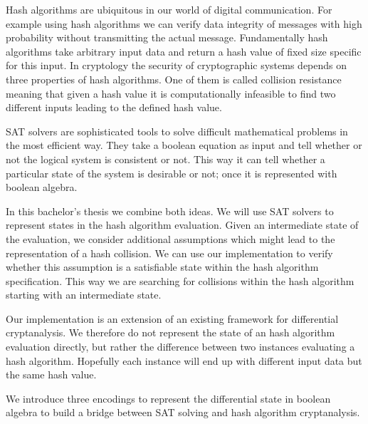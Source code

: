 Hash algorithms are ubiquitous in our world of digital communication.
For example using hash algorithms we can verify data integrity of messages
with high probability without transmitting the actual message. Fundamentally
hash algorithms take arbitrary input data and return a hash value of fixed
size specific for this input. In cryptology the security of cryptographic
systems depends on three properties of hash algorithms. One of them is called
collision resistance meaning that given a hash value it is computationally
infeasible to find two different inputs leading to the defined hash value.

SAT solvers are sophisticated tools to solve difficult mathematical problems
in the most efficient way. They take a boolean equation as input and tell
whether or not the logical system is consistent or not. This way it can tell
whether a particular state of the system is desirable or not; once it is
represented with boolean algebra.

In this bachelor's thesis we combine both ideas. We will use SAT solvers to
represent states in the hash algorithm evaluation. Given an intermediate
state of the evaluation, we consider additional assumptions which might
lead to the representation of a hash collision. We can use our implementation
to verify whether this assumption is a satisfiable state within the hash algorithm
specification. This way we are searching for collisions within the hash
algorithm starting with an intermediate state.

Our implementation is an extension of an existing framework for differential
cryptanalysis. We therefore do not represent the state of an hash algorithm
evaluation directly, but rather the difference between two instances evaluating
a hash algorithm. Hopefully each instance will end up with different input data
but the same hash value.

We introduce three encodings to represent the differential state in boolean
algebra to build a bridge between SAT solving and hash algorithm cryptanalysis.
